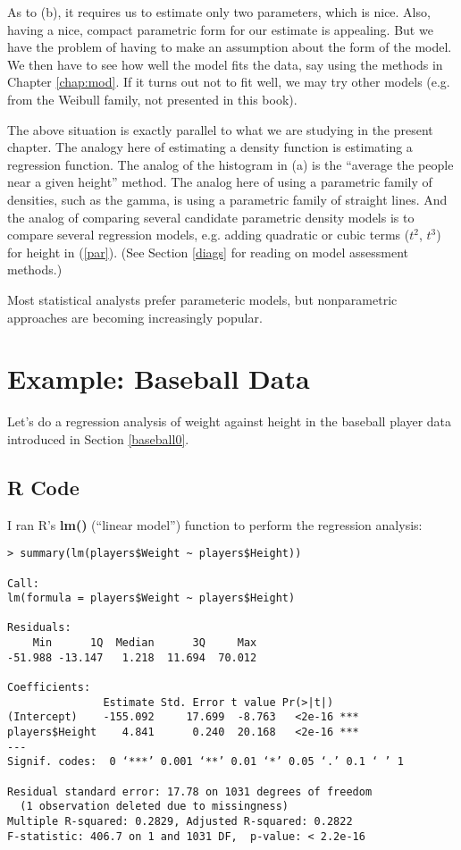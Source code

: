 As to (b), it requires us to estimate only two parameters, which is
nice.  Also, having a nice, compact parametric form for our estimate is
appealing.  But we have the problem of having to make an assumption
about the form of the model.  We then have to see how well the model
fits the data, say using the methods in Chapter \ref{chap:mod}.  If it
turns out not to fit well, we may try other models (e.g. from the
Weibull family, not presented in this book).

The above situation is exactly parallel to what we are studying in the
present chapter.  The analogy here of estimating a density function is
estimating a regression function.  The analog of the histogram in (a) is
the ``average the people near a given height'' method.  The analog here
of using a parametric family of densities, such as the gamma, is using a
parametric family of straight lines.  And the analog of comparing
several candidate parametric density models is to compare several
regression models, e.g. adding quadratic or cubic terms ($t^2$, $t^3$)
for height in (\ref{par}).  (See Section \ref{diags} for reading on
model assessment methods.)

Most statistical analysts prefer parameteric models, but nonparametric
approaches are becoming increasingly popular.

\section{Example:  Baseball Data}
\label{baseball1}

Let's do a regression analysis of weight against height in the baseball
player data introduced in Section \ref{baseball0}.

\subsection{R Code}

I ran R's {\bf lm()} (``linear model'') function to perform the
regression analysis:

\begin{lstlisting}
> summary(lm(players$Weight ~ players$Height))

Call:
lm(formula = players$Weight ~ players$Height)

Residuals:
    Min      1Q  Median      3Q     Max 
-51.988 -13.147   1.218  11.694  70.012 

Coefficients:
               Estimate Std. Error t value Pr(>|t|)    
(Intercept)    -155.092     17.699  -8.763   <2e-16 ***
players$Height    4.841      0.240  20.168   <2e-16 ***
---
Signif. codes:  0 ‘***’ 0.001 ‘**’ 0.01 ‘*’ 0.05 ‘.’ 0.1 ‘ ’ 1 

Residual standard error: 17.78 on 1031 degrees of freedom
  (1 observation deleted due to missingness)
Multiple R-squared: 0.2829,	Adjusted R-squared: 0.2822 
F-statistic: 406.7 on 1 and 1031 DF,  p-value: < 2.2e-16 
\end{lstlisting}

